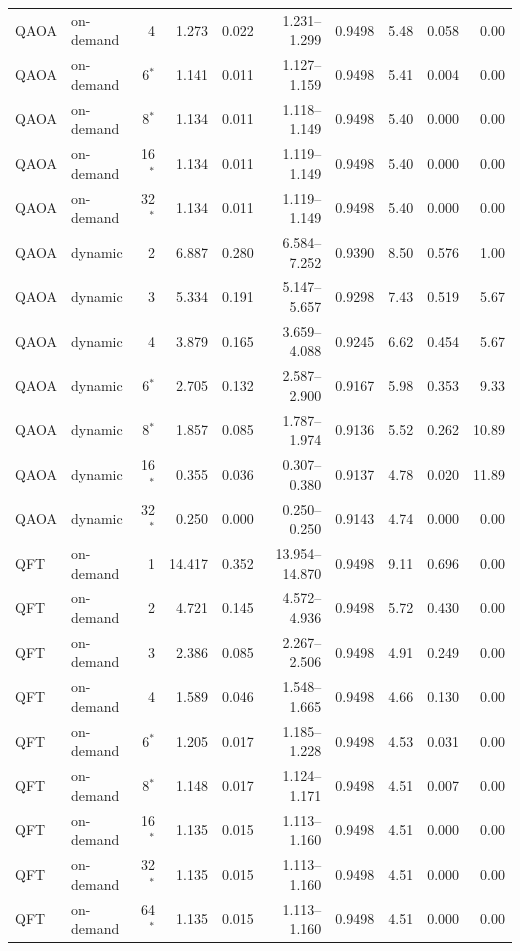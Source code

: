 {\begin{longtable}{@{}llrrrrrrrr@{}}
QAOA & on-demand & 4 & 1.273 & 0.022 & 1.231--1.299 & 0.9498 & 5.48 & 0.058 & 0.00 \\
QAOA & on-demand & 6$^*$ & 1.141 & 0.011 & 1.127--1.159 & 0.9498 & 5.41 & 0.004 & 0.00 \\
QAOA & on-demand & 8$^*$ & 1.134 & 0.011 & 1.118--1.149 & 0.9498 & 5.40 & 0.000 & 0.00 \\
QAOA & on-demand & 16$^*$ & 1.134 & 0.011 & 1.119--1.149 & 0.9498 & 5.40 & 0.000 & 0.00 \\
QAOA & on-demand & 32$^*$ & 1.134 & 0.011 & 1.119--1.149 & 0.9498 & 5.40 & 0.000 & 0.00 \\
QAOA & dynamic & 2 & 6.887 & 0.280 & 6.584--7.252 & 0.9390 & 8.50 & 0.576 & 1.00 \\
QAOA & dynamic & 3 & 5.334 & 0.191 & 5.147--5.657 & 0.9298 & 7.43 & 0.519 & 5.67 \\
QAOA & dynamic & 4 & 3.879 & 0.165 & 3.659--4.088 & 0.9245 & 6.62 & 0.454 & 5.67 \\
QAOA & dynamic & 6$^*$ & 2.705 & 0.132 & 2.587--2.900 & 0.9167 & 5.98 & 0.353 & 9.33 \\
QAOA & dynamic & 8$^*$ & 1.857 & 0.085 & 1.787--1.974 & 0.9136 & 5.52 & 0.262 & 10.89 \\
QAOA & dynamic & 16$^*$ & 0.355 & 0.036 & 0.307--0.380 & 0.9137 & 4.78 & 0.020 & 11.89 \\
QAOA & dynamic & 32$^*$ & 0.250 & 0.000 & 0.250--0.250 & 0.9143 & 4.74 & 0.000 & 0.00 \\
QFT & on-demand & 1 & 14.417 & 0.352 & 13.954--14.870 & 0.9498 & 9.11 & 0.696 & 0.00 \\
QFT & on-demand & 2 & 4.721 & 0.145 & 4.572--4.936 & 0.9498 & 5.72 & 0.430 & 0.00 \\
QFT & on-demand & 3 & 2.386 & 0.085 & 2.267--2.506 & 0.9498 & 4.91 & 0.249 & 0.00 \\
QFT & on-demand & 4 & 1.589 & 0.046 & 1.548--1.665 & 0.9498 & 4.66 & 0.130 & 0.00 \\
QFT & on-demand & 6$^*$ & 1.205 & 0.017 & 1.185--1.228 & 0.9498 & 4.53 & 0.031 & 0.00 \\
QFT & on-demand & 8$^*$ & 1.148 & 0.017 & 1.124--1.171 & 0.9498 & 4.51 & 0.007 & 0.00 \\
QFT & on-demand & 16$^*$ & 1.135 & 0.015 & 1.113--1.160 & 0.9498 & 4.51 & 0.000 & 0.00 \\
QFT & on-demand & 32$^*$ & 1.135 & 0.015 & 1.113--1.160 & 0.9498 & 4.51 & 0.000 & 0.00 \\
QFT & on-demand & 64$^*$ & 1.135 & 0.015 & 1.113--1.160 & 0.9498 & 4.51 & 0.000 & 0.00 \\

\end{longtable}}
